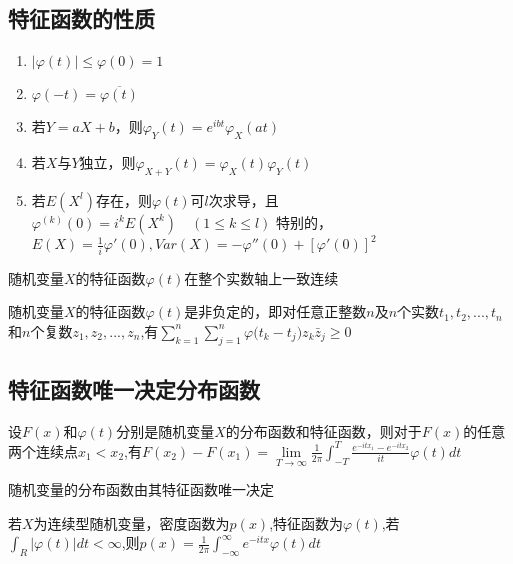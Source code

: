 \subsection{特征函数的性质}
\begin{enumerate}
    \item $\left| {\varphi (t)} \right| \leqslant \varphi (0) = 1$
    \item $\varphi ( - t) = \overline {\varphi (t)} $
    \item 若$Y=aX+b$，则${\varphi _Y}(t) = {e^{ibt}}{\varphi _X}(at)$
    \item 若$X$与$Y$独立，则${\varphi _{X + Y}}(t) = {\varphi _X}(t){\varphi _Y}(t)$
    \item 若$E({X^l})$存在，则$\varphi (t)$可$l$次求导，且${\varphi ^{(k)}}(0) = {i^k}E({X^k})\quad (1 \leqslant k \leqslant l)$
          特别的，$E(X) = \frac{1}{i}\varphi '(0),Var(X) =  - \varphi ''(0) + {[\varphi '(0)]^2}$
\end{enumerate}
\begin{theorem}[一致连续性]
    随机变量$X$的特征函数$ \varphi (t)$在整个实数轴上一致连续
\end{theorem}

\begin{theorem}[非负定性]
    随机变量$X$的特征函数$\varphi (t)$是非负定的，即对任意正整数$n$及$n$个实数${t_1},{t_2},...,{t_n}$和$n$个复数$z_1,z_2,...,z_n$,有$\sum\limits_{k = 1}^n {\sum\limits_{j = 1}^n {\varphi ({t_k} - } } {t_j}){z_k}{\bar z_j} \geqslant 0$
\end{theorem}

\subsection{特征函数唯一决定分布函数}
\begin{theorem}[逆转公式]
    设$F(x)$和$\varphi (t)$分别是随机变量$X$的分布函数和特征函数，则对于$F(x)$的任意两个连续点${x_1} < {x_2}$,有$F({x_2}) - F({x_1}) = \mathop {\lim }\limits_{T \to \infty } \frac{1}{{2\pi }}\int_{ - T}^T {\frac{{{e^{ - it{x_1}}} - {e^{ - it{x_2}}}}}{{it}}} \varphi (t)dt$
\end{theorem}

\begin{theorem}
    随机变量的分布函数由其特征函数唯一决定
\end{theorem}

\begin{definition}
    若$X$为连续型随机变量，密度函数为$p(x)$,特征函数为$\varphi (t)$,若$\int_R {\left| {\varphi (t)} \right|} dt < \infty $,则$p(x) = \frac{1}{{2\pi }}\int_{ - \infty }^\infty  {{e^{ - itx}}} \varphi (t)dt$

\end{definition}



